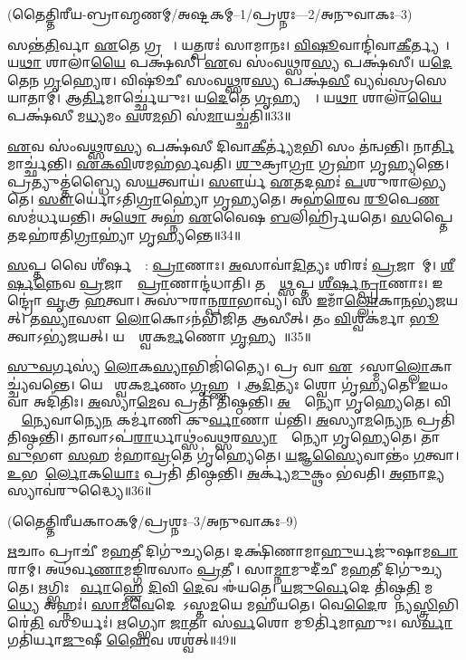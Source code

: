 \centerline{\normalsize(𑌤𑍈𑌤𑍍𑌤𑌿𑌰𑍀𑌯-𑌬𑍍𑌰𑌾𑌹𑍍𑌮𑌣𑌮𑍍/𑌅𑌷𑍍𑌟𑌕𑌮𑍍–1/𑌪𑍍𑌰𑌶𑍍𑌨𑌃—2/𑌅𑌨𑍁𑌵𑌾𑌕𑌃–3)}

𑌸𑌨𑍍𑌤॑\ul{𑌤𑌿}𑌰𑍍𑌵𑌾 \ul{𑌏}𑌤𑍇 𑌗𑍍𑌰𑌹𑌾𑌃᳚।
𑌯𑌤𑍍𑌪𑌰𑌃॑ 𑌸𑌾𑌮𑌾𑌨𑌃।
\ul{𑌵𑌿}\ul{𑌷𑍂}𑌵𑌾𑌨𑍍𑌦𑌿॑𑌵𑌾\-\ul{𑌕𑍀}𑌰𑍍𑌤𑍍𑌯𑌮𑍍᳚।
𑌯\ul{𑌥𑌾} 𑌶𑌾𑌲𑌾॑\ul{𑌯𑍈} 𑌪𑌕𑍍𑌷॑𑌸𑍀।
\ul{𑌏}𑌵 𑌸𑌂॑𑌵\ul{𑌥𑍍𑌸}𑌰\ul{𑌸𑍍𑌯} 𑌪𑌕𑍍𑌷॑𑌸𑍀।
𑌯\ul{𑌦𑍇}𑌤𑍇𑌨 \ul{𑌗𑍃}𑌹𑍍𑌯𑍇𑌰\sn{}।
𑌵𑌿𑌷𑍂॑𑌚𑍀 𑌸𑌂𑌵\ul{𑌥𑍍𑌸}𑌰\ul{𑌸𑍍𑌯} 𑌪𑌕𑍍𑌷॑\ul{𑌸𑍀} 𑌵𑍍𑌯𑌵॑𑌸𑍍𑌰𑌸𑍇𑌯𑌾𑌤𑌾𑌮𑍍।
𑌆\ul{𑌰𑍍𑌤𑌿}𑌮𑌾𑌰𑍍𑌚𑍍𑌛𑍇॑𑌯𑍁𑌃।
𑌯\ul{𑌦𑍇}𑌤𑍇 \ul{𑌗𑍃}𑌹𑍍𑌯𑌨𑍍𑌤𑍇᳚।
𑌯\ul{𑌥𑌾} 𑌶𑌾𑌲𑌾॑\ul{𑌯𑍈} 𑌪𑌕𑍍𑌷॑𑌸𑍀 𑌮\ul{𑌧𑍍𑌯}𑌮𑌂 \ul{𑌵}\ul{}𑌶\ul{𑌮}𑌭𑌿 𑌸॑\ul{𑌮𑌾}𑌯𑌚𑍍𑌛॑𑌤𑌿॥33॥

\ul{𑌏}𑌵 𑌸𑌂॑𑌵\ul{𑌥𑍍𑌸}𑌰\ul{𑌸𑍍𑌯} 𑌪𑌕𑍍𑌷॑𑌸𑍀 𑌦𑌿𑌵𑌾\ul{𑌕𑍀}𑌰𑍍𑌤𑍍𑌯॑\ul{𑌮}𑌭𑌿 𑌸𑌂 𑌤॑𑌨𑍍𑌵𑌨𑍍𑌤𑌿।
𑌨𑌾\ul{𑌰𑍍𑌤𑌿}𑌮𑌾𑌰𑍍𑌚𑍍𑌛॑𑌨𑍍𑌤𑌿।
\ul{𑌏}\ul{𑌕}\ul{𑌵𑌿}\ul{}𑌶𑌮𑌹॑𑌰𑍍𑌭𑌵𑌤𑌿।
\ul{𑌶𑍁}𑌕𑍍𑌰𑌾\ul{𑌗𑍍𑌰𑌾} 𑌗𑍍𑌰𑌹𑌾॑ 𑌗𑍃𑌹𑍍𑌯𑌨𑍍𑌤𑍇।
𑌪𑍍𑌰𑌤𑍍𑌯𑍁𑌤𑍍𑌤॑𑌬𑍍𑌧𑍍𑌯𑍈 𑌸\ul{𑌯}𑌤𑍍𑌵𑌾𑌯॑।
\ul{𑌸𑍗}𑌰𑍍𑌯॑ \ul{𑌏}𑌤𑌦𑌹𑌃॑ \ul{𑌪}𑌶𑍁𑌰𑌾𑌲॑𑌭𑍍𑌯𑌤𑍇।
\ul{𑌸𑍗}𑌰𑍍𑌯𑍋॑\-𑌽𑌤𑌿\ul{𑌗𑍍𑌰𑌾}𑌹𑍍𑌯𑍋॑ 𑌗𑍃𑌹𑍍𑌯𑌤𑍇।
𑌅𑌹॑\ul{𑌰𑍇}𑌵 \ul{𑌰𑍂}𑌪𑍇\ul{𑌣} 𑌸𑌮॑𑌰𑍍𑌧𑌯𑌨𑍍𑌤𑌿।
𑌅\ul{𑌥𑍋} 𑌅𑌹𑍍𑌨॑ \ul{𑌏}𑌵𑍈𑌷 \ul{𑌬}𑌲𑌿𑌰𑍍\mbox{}𑌹𑍍𑌰𑌿॑𑌯𑌤𑍇।
\ul{𑌸}𑌪𑍍𑌤𑍈𑌤𑌦𑌹॑𑌰𑌤𑌿\ul{𑌗𑍍𑌰𑌾}𑌹𑍍𑌯𑌾॑ 𑌗𑍃𑌹𑍍𑌯𑌨𑍍𑌤𑍇॥34॥

\ul{𑌸}𑌪𑍍𑌤 𑌵𑍈 𑌶𑍀॑𑌰𑍍\mbox{}\ul{𑌷}𑌣𑍍𑌯𑌾᳚: \ul{𑌪𑍍𑌰𑌾}𑌣𑌾𑌃।
\ul{𑌅}𑌸𑌾𑌵𑌾॑\ul{𑌦𑌿}𑌤𑍍𑌯𑌃 𑌶𑌿𑌰𑌃॑ \ul{𑌪𑍍𑌰}𑌜𑌾𑌨𑌾᳚𑌮𑍍।
\ul{𑌶𑍀}\ul{𑌰𑍍}𑌷\ul{𑌨𑍍𑌨𑍇}𑌵 \ul{𑌪𑍍𑌰}𑌜𑌾𑌨𑌾𑌂᳚ \ul{𑌪𑍍𑌰𑌾}𑌣𑌾𑌨𑍍𑌦॑𑌧𑌾𑌤𑌿।
𑌤𑌸𑍍𑌮𑌾᳚\ul{𑌥𑍍𑌸}𑌪𑍍𑌤 \ul{𑌶𑍀}\ul{𑌰𑍍}𑌷\ul{𑌨𑍍𑌪𑍍𑌰𑌾}𑌣𑌾𑌃।
𑌇𑌨𑍍𑌦𑍍𑌰𑍋॑ \ul{𑌵𑍃}𑌤𑍍𑌰 \ul{𑌹}𑌤𑍍𑌵𑌾।
𑌅𑌸𑍁॑𑌰𑌾𑌨𑍍𑌪\ul{𑌰𑌾}𑌭𑌾𑌵𑍍𑌯॑।
𑌸 \ul{𑌇}𑌮𑌾𑌁\ul{𑌲𑍍𑌲𑍋}𑌕𑌾\ul{𑌨}𑌭𑍍𑌯॑𑌜𑌯𑌤𑍍।
𑌤\ul{𑌸𑍍𑌯𑌾}𑌸𑍗 \ul{𑌲𑍋}𑌕𑍋\-𑌽𑌨॑𑌭𑌿𑌜𑌿𑌤 𑌆𑌸𑍀𑌤𑍍।
𑌤𑌂 \ul{𑌵𑌿}𑌶𑍍𑌵𑌕॑𑌰𑍍𑌮𑌾 \ul{𑌭𑍂}𑌤𑍍𑌵𑌾\-𑌽𑌭𑍍𑌯॑𑌜𑌯𑌤𑍍।
𑌯𑌦𑍍𑌵𑍈᳚𑌶𑍍𑌵𑌕\ul{𑌰𑍍𑌮}𑌣𑍋 \ul{𑌗𑍃}𑌹𑍍𑌯𑌤𑍇᳚॥35॥

\ul{𑌸𑍁}\ul{𑌵}𑌰𑍍𑌗𑌸𑍍𑌯॑ \ul{𑌲𑍋}𑌕\ul{𑌸𑍍𑌯𑌾}𑌭𑌿𑌜𑌿॑𑌤𑍍𑌯𑍈।
𑌪𑍍𑌰 𑌵𑌾 \ul{𑌏}𑌤𑍇᳚\-𑌽𑌸𑍍𑌮𑌾\ul{𑌲𑍍𑌲𑍋}𑌕𑌾𑌚𑍍𑌚𑍍𑌯॑𑌵𑌨𑍍𑌤𑍇।
𑌯𑍇 𑌵𑍈᳚𑌶𑍍𑌵𑌕\ul{𑌰𑍍𑌮}𑌣𑌂 \ul{𑌗𑍃}𑌹𑍍𑌣𑌤𑍇᳚।
\ul{𑌆}\ul{𑌦𑌿}𑌤𑍍𑌯𑌃 𑌶𑍍𑌵𑍋 𑌗𑍃॑𑌹𑍍𑌯𑌤𑍇।
\ul{𑌇}𑌯𑌂 𑌵𑌾 𑌅𑌦𑌿॑𑌤𑌿𑌃।
\ul{𑌅}𑌸𑍍𑌯𑌾\ul{𑌮𑍇}𑌵 𑌪𑍍𑌰𑌤𑌿॑ 𑌤𑌿𑌷𑍍𑌠𑌨𑍍𑌤𑌿।
\ul{𑌅}𑌨𑍍𑌯𑍋᳚𑌨𑍍𑌯𑍋 𑌗𑍃𑌹𑍍𑌯𑍇𑌤𑍇।
𑌵𑌿𑌶𑍍𑌵𑌾᳚\ul{𑌨𑍍𑌯𑍇}𑌵𑌾𑌨𑍍𑌯𑍇\ul{𑌨} 𑌕𑌰𑍍𑌮𑌾॑𑌣𑌿 𑌕𑍁\ul{𑌰𑍍𑌵𑌾}𑌣𑌾 𑌯॑𑌨𑍍𑌤𑌿।
\ul{𑌅}𑌸𑍍𑌯𑌾\ul{𑌮}𑌨𑍍𑌯𑍇\ul{𑌨} 𑌪𑍍𑌰𑌤𑌿॑ 𑌤𑌿𑌷𑍍𑌠𑌨𑍍𑌤𑌿।
𑌤𑌾𑌵𑌾𑌽𑌪॑\ul{𑌰𑌾}𑌰𑍍𑌧𑌾𑌥𑍍𑌸𑌂॑𑌵\ul{𑌥𑍍𑌸}𑌰\ul{𑌸𑍍𑌯𑌾}𑌨𑍍𑌯𑍋᳚𑌨𑍍𑌯𑍋 𑌗𑍃𑌹𑍍𑌯𑍇𑌤𑍇।
𑌤𑌾\ul{𑌵𑍁}𑌭𑍗 \ul{𑌸}𑌹 𑌮॑𑌹𑌾\ul{𑌵𑍍𑌰}𑌤𑍇 𑌗𑍃॑𑌹𑍍𑌯𑍇𑌤𑍇।
\ul{𑌯}𑌜𑍍𑌞\ul{𑌸𑍍𑌯𑍈}𑌵𑌾𑌨𑍍𑌤𑌂॑ \ul{𑌗}𑌤𑍍𑌵𑌾।
\ul{𑌉}𑌭𑌯𑍋᳚\ul{𑌰𑍍𑌲𑍋}𑌕\ul{𑌯𑍋𑌃} 𑌪𑍍𑌰𑌤𑌿॑ 𑌤𑌿𑌷𑍍𑌠𑌨𑍍𑌤𑌿।
\ul{𑌅}𑌰𑍍𑌕𑍍𑌯॑\ul{𑌮𑍁}𑌕𑍍𑌥𑌂 𑌭॑𑌵𑌤𑌿।
\ul{𑌅}𑌨𑍍𑌨𑌾\ul{𑌦𑍍𑌯}𑌸𑍍𑌯𑌾𑌵॑𑌰𑍁𑌦𑍍𑌧𑍍𑌯𑍈॥36॥



\centerline{\normalsize(𑌤𑍈𑌤𑍍𑌤𑌿𑌰𑍀𑌯𑌕𑌾𑌠𑌕𑌮𑍍/𑌪𑍍𑌰𑌶𑍍𑌨𑌃–3/𑌅𑌨𑍁𑌵𑌾𑌕𑌃–9)}

   \ul{𑌋}𑌚𑌾𑌂 𑌪𑍍𑌰𑌾𑌚𑍀॑ 𑌮\ul{𑌹}𑌤𑍀 𑌦𑌿𑌗𑍁॑𑌚𑍍𑌯𑌤𑍇।
   𑌦𑌕𑍍𑌷𑌿॑𑌣𑌾𑌮𑌾\ul{𑌹𑍁}𑌰𑍍𑌯𑌜𑍁॑𑌷𑌾𑌮\ul{𑌪𑌾}𑌰𑌾𑌮𑍍।
   𑌅𑌥॑𑌰𑍍𑌵\ul{𑌣𑌾}𑌮𑌙𑍍𑌗𑌿॑𑌰𑌸𑌾𑌂 \ul{𑌪𑍍𑌰}𑌤𑍀𑌚𑍀᳚।
   𑌸𑌾\ul{𑌮𑍍𑌨𑌾}𑌮𑍁𑌦𑍀॑𑌚𑍀 𑌮\ul{𑌹}𑌤𑍀 𑌦𑌿𑌗𑍁॑𑌚𑍍𑌯𑌤𑍇।
   \ul{𑌋}𑌗𑍍𑌭𑌿𑌃 𑌪𑍂᳚\ul{𑌰𑍍𑌵𑌾}𑌹𑍍𑌣𑍇 \ul{𑌦𑌿}𑌵𑌿 \ul{𑌦𑍇}𑌵 𑌈॑𑌯𑌤𑍇।
   \ul{𑌯}\ul{𑌜𑍁}\ul{𑌰𑍍𑌵𑍇}𑌦𑍇 𑌤𑌿॑𑌷𑍍𑌠\ul{𑌤𑌿} 𑌮\ul{𑌧𑍍𑌯𑍇} 𑌅𑌹𑍍𑌨𑌃॑।
   \ul{𑌸𑌾}\ul{𑌮}\ul{𑌵𑍇}𑌦𑍇𑌨𑌾᳚𑌽𑌸𑍍𑌤\ul{𑌮}𑌯𑍇 𑌮𑌹𑍀॑𑌯𑌤𑍇।
   𑌵𑍇\ul{𑌦𑍈}𑌰𑌶𑍂᳚𑌨𑍍𑌯\ul{𑌸𑍍𑌤𑍍𑌰𑌿}𑌭𑌿𑌰𑍇॑\ul{𑌤𑌿} 𑌸𑍂𑌰𑍍𑌯𑌃॑।
   \ul{𑌋}𑌗𑍍𑌭𑍍𑌯𑍋 \ul{𑌜𑌾}𑌤𑌾 𑌸॑\ul{𑌰𑍍𑌵}𑌶𑍋 𑌮𑍂𑌰𑍍𑌤𑌿॑𑌮𑌾𑌹𑍁𑌃।
   𑌸\ul{𑌰𑍍𑌵𑌾} 𑌗𑌤𑌿॑𑌰𑍍𑌯𑌾\ul{𑌜𑍁}𑌷𑍀 \ul{𑌹𑍈}𑌵 𑌶𑌶𑍍𑌵॑𑌤𑍍॥49॥

